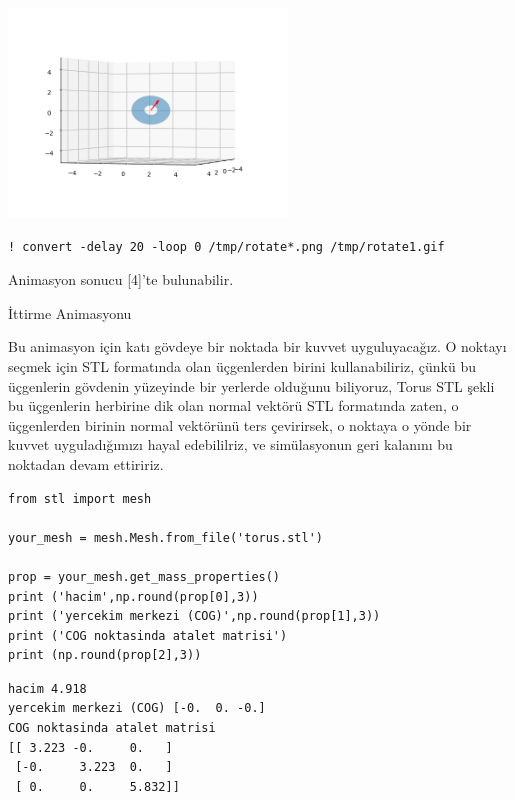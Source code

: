 \documentclass[12pt,fleqn]{article}\usepackage{../../common}
\begin{document}
\includegraphics[width=20em]{sim1/rotate_14.png}

\begin{verbatim}
! convert -delay 20 -loop 0 /tmp/rotate*.png /tmp/rotate1.gif
\end{verbatim}

Animasyon sonucu [4]'te bulunabilir.














İttirme Animasyonu

Bu animasyon için katı gövdeye bir noktada bir kuvvet uyguluyacağız. O noktayı
seçmek için STL formatında olan üçgenlerden birini kullanabiliriz, çünkü bu
üçgenlerin gövdenin yüzeyinde bir yerlerde olduğunu biliyoruz, Torus STL şekli
bu üçgenlerin herbirine dik olan normal vektörü STL formatında zaten, o
üçgenlerden birinin normal vektörünü ters çevirirsek, o noktaya o yönde bir
kuvvet uyguladığımızı hayal edebililriz, ve simülasyonun geri kalanını bu
noktadan devam ettiririz.

\begin{verbatim}
from stl import mesh

your_mesh = mesh.Mesh.from_file('torus.stl')

prop = your_mesh.get_mass_properties()
print ('hacim',np.round(prop[0],3))
print ('yercekim merkezi (COG)',np.round(prop[1],3))
print ('COG noktasinda atalet matrisi')
print (np.round(prop[2],3))
\end{verbatim}

\begin{verbatim}
hacim 4.918
yercekim merkezi (COG) [-0.  0. -0.]
COG noktasinda atalet matrisi
[[ 3.223 -0.     0.   ]
 [-0.     3.223  0.   ]
 [ 0.     0.     5.832]]
\end{verbatim}
\end{document}
